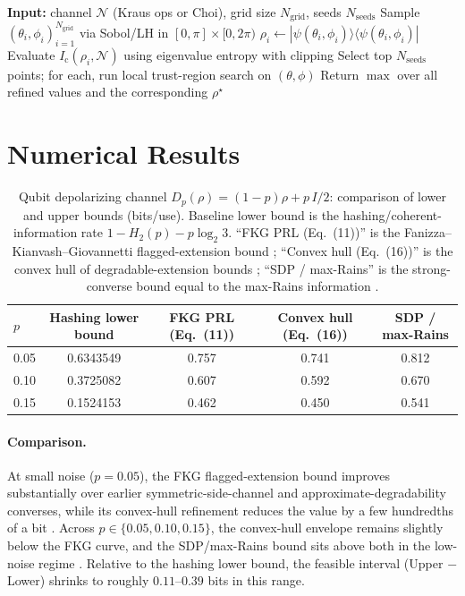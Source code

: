 \documentclass[11pt]{article}
\theoremstyle{plain}
\theoremstyle{definition}
\numberwithin{equation}{section}
\begin{document}
\begin{algorithm}[H]
\caption{Maximizing $I_{\mathrm c}$ over qubit inputs for a fixed channel $\mathcal{N}$}
\begin{algorithmic}[1]
\STATE \textbf{Input:} channel $\mathcal{N}$ (Kraus ops or Choi), grid size $N_{\mathrm{grid}}$, seeds $N_{\mathrm{seeds}}$
\STATE Sample $(\theta_i,\phi_i)_{i=1}^{N_{\mathrm{grid}}}$ via Sobol/LH in $[0,\pi]\times[0,2\pi)$
  \STATE $\rho_i\leftarrow|\psi(\theta_i,\phi_i)\rangle\!\langle\psi(\theta_i,\phi_i)|$
  \STATE Evaluate $I_{\mathrm c}(\rho_i,\mathcal{N})$ using eigenvalue entropy with clipping
\ENDFOR
\STATE Select top $N_{\mathrm{seeds}}$ points; for each, run local trust-region search on $(\theta,\phi)$
\STATE Return $\max$ over all refined values and the corresponding $\rho^\star$
\end{algorithmic}
\end{algorithm}



\section{Numerical Results}


\begin{table}[H]
\centering
\caption{Qubit depolarizing channel $D_p(\rho)=(1-p)\rho + p\,I/2$: comparison of lower and upper bounds (bits/use). 
Baseline lower bound is the hashing/coherent-information rate $1-H_2(p)-p\log_2 3$. 
“FKG PRL (Eq.~(11))” is the Fanizza--Kianvash--Giovannetti flagged-extension bound \cite{FKG20}; 
“Convex hull (Eq.~(16))” is the convex hull of degradable-extension bounds \cite{KFG22}; 
“SDP / max-Rains” is the strong-converse bound equal to the max-Rains information \cite{Wang19,Wang21}.}
\label{tab:dep_compare}
\begin{tabular}{@{}lcccc@{}}
\toprule
$p$ & Hashing lower bound & FKG PRL (Eq.~(11)) & Convex hull (Eq.~(16)) & SDP / max-Rains \\
\midrule
0.05 & 0.6343549 & 0.757 & 0.741 & 0.812 \\
0.10 & 0.3725082 & 0.607 & 0.592 & 0.670 \\
0.15 & 0.1524153 & 0.462 & 0.450 & 0.541 \\
\bottomrule
\end{tabular}
\end{table}

\paragraph{Comparison.} At small noise ($p{=}0.05$), the FKG flagged-extension bound improves substantially over earlier symmetric-side-channel and approximate-degradability converses, while its convex-hull refinement reduces the value by a few hundredths of a bit \cite{FKG20,KFG22}. 
Across $p\in\{0.05,0.10,0.15\}$, the convex-hull envelope remains slightly below the FKG curve, and the SDP/max-Rains bound sits above both in the low-noise regime \cite{Wang19,Wang21}. 
Relative to the hashing lower bound, the feasible interval (Upper $-$ Lower) shrinks to roughly $0.11$--$0.39$ bits in this range.
\end{document}
